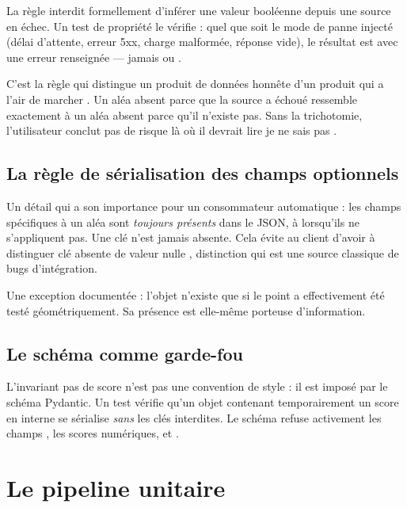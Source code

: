 La règle  interdit formellement d'inférer une valeur booléenne depuis
une source en échec. Un test de propriété le vérifie : quel que soit le mode de
panne injecté (délai d'attente, erreur 5xx, charge malformée, réponse vide), le
résultat est  avec une erreur renseignée — jamais  ou
.

\begin{honesty}
C'est la règle qui distingue un produit de données honnête d'un produit
\og qui a l'air de marcher \fg. Un aléa absent parce que la source a échoué
ressemble exactement à un aléa absent parce qu'il n'existe pas. Sans la
trichotomie, l'utilisateur conclut \og pas de risque \fg{} là où il devrait lire
\og je ne sais pas \fg.
\end{honesty}

\subsection{La règle de sérialisation des champs optionnels}

Un détail qui a son importance pour un consommateur automatique : les champs
spécifiques à un aléa sont \emph{toujours présents} dans le JSON, à
 lorsqu'ils ne s'appliquent pas. Une clé n'est jamais absente. Cela
évite au client d'avoir à distinguer \og clé absente \fg{} de \og valeur
nulle \fg, distinction qui est une source classique de bugs d'intégration.

Une exception documentée : l'objet  n'existe que si le
point a effectivement été testé géométriquement. Sa présence est elle-même
porteuse d'information.

\subsection{Le schéma comme garde-fou}

L'invariant \og pas de score \fg n'est pas une convention de style : il est
imposé par le schéma Pydantic. Un test vérifie qu'un objet contenant
temporairement un score en interne se sérialise \emph{sans} les clés
interdites. Le schéma refuse activement les champs , les scores
numériques,  et .

\section{Le pipeline unitaire}

